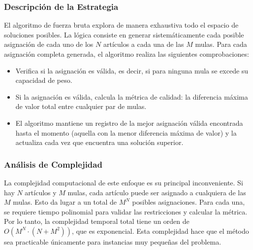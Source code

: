 \documentclass[12pt, a4paper]{article}
\begin{document}
    \subsubsection{Descripción de la Estrategia}
    El algoritmo de fuerza bruta explora de manera exhaustiva todo el espacio de soluciones posibles. La lógica consiste en generar sistemáticamente cada posible asignación de cada uno de los $N$ artículos a cada una de las $M$ mulas. Para cada asignación completa generada, el algoritmo realiza las siguientes comprobaciones:
    \begin{itemize}
        \item Verifica si la asignación es válida, es decir, si para ninguna mula se excede su capacidad de peso.
        \item Si la asignación es válida, calcula la métrica de calidad: la diferencia máxima de valor total entre cualquier par de mulas.
        \item El algoritmo mantiene un registro de la mejor asignación válida encontrada hasta el momento (aquella con la menor diferencia máxima de valor) y la actualiza cada vez que encuentra una solución superior.
    \end{itemize}

    \subsubsection{Análisis de Complejidad}
    La complejidad computacional de este enfoque es su principal inconveniente. Si hay $N$ artículos y $M$ mulas, cada artículo puede ser asignado a cualquiera de las $M$ mulas. Esto da lugar a un total de $M^N$ posibles asignaciones. Para cada una, se requiere tiempo polinomial para validar las restricciones y calcular la métrica. Por lo tanto, la complejidad temporal total tiene un orden de $O(M^N \cdot (N + M^2))$, que es exponencial. Esta complejidad hace que el método sea practicable únicamente para instancias muy pequeñas del problema.
\end{document}
